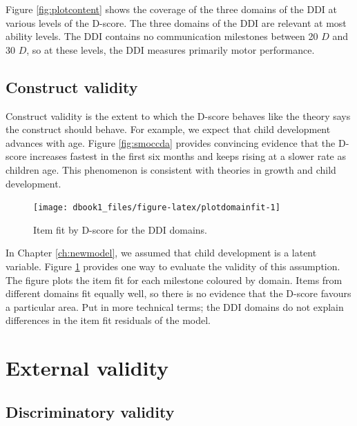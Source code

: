 \documentclass[
]{book}
\begin{document}
Figure \ref{fig:plotcontent} shows the coverage of the three domains of the DDI at various levels of the D-score. The three domains of the DDI are relevant at most ability levels. The DDI contains no communication milestones between 20 \(D\) and 30 \(D\), so at these levels, the DDI measures primarily motor performance.

\hypertarget{construct-validity}{%
\subsection{Construct validity}\label{construct-validity}}

Construct validity is the extent to which the D-score behaves like the theory says the construct should behave. For example, we expect that child development advances with age. Figure \ref{fig:smoccda} provides convincing evidence that the D-score increases fastest in the first six months and keeps rising at a slower rate as children age. This phenomenon is consistent with theories in growth and child development.

\begin{figure}

{\centering \texttt{[image: dbook1\_files/figure-latex/plotdomainfit-1]} 

}

\caption{Item fit by D-score for the DDI domains.}\label{fig:plotdomainfit}
\end{figure}



In Chapter \ref{ch:newmodel}, we assumed that child development is a latent variable. Figure \ref{fig:plotdomainfit} provides one way to evaluate the validity of this assumption. The figure plots the item fit for each milestone coloured by domain. Items from different domains fit equally well, so there is no evidence that the D-score favours a particular area. Put in more technical terms; the DDI domains do not explain differences in the item fit residuals of the model.

\hypertarget{sec:external}{%
\section{External validity}\label{sec:external}}

\hypertarget{discriminatory-validity}{%
\subsection{Discriminatory validity}\label{discriminatory-validity}}
\end{document}
